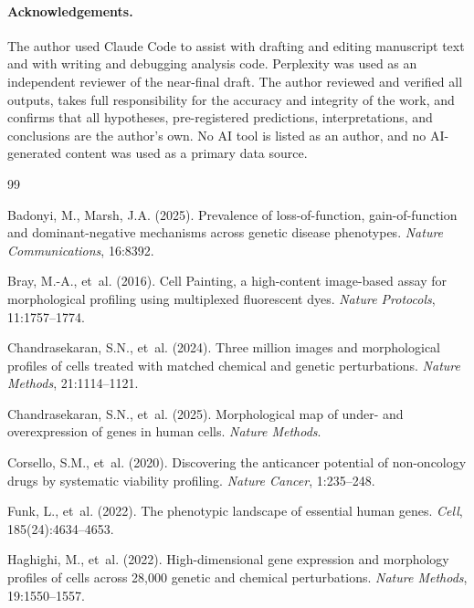 \documentclass[11pt]{article}
\begin{document}
\paragraph{Acknowledgements.}
The author used Claude Code \cite{claudecode} to assist with drafting and editing manuscript text and with writing and debugging analysis code. Perplexity \cite{perplexityai} was used as an independent reviewer of the near-final draft. The author reviewed and verified all outputs, takes full responsibility for the accuracy and integrity of the work, and confirms that all hypotheses, pre-registered predictions, interpretations, and conclusions are the author's own. No AI tool is listed as an author, and no AI-generated content was used as a primary data source.

\begin{thebibliography}{99}

Badonyi, M., Marsh, J.A. (2025).
Prevalence of loss-of-function, gain-of-function and dominant-negative mechanisms across genetic disease phenotypes.
\textit{Nature Communications}, 16:8392.

Bray, M.-A., et~al. (2016).
Cell Painting, a high-content image-based assay for morphological profiling using multiplexed fluorescent dyes.
\textit{Nature Protocols}, 11:1757--1774.

Chandrasekaran, S.N., et~al. (2024).
Three million images and morphological profiles of cells treated with matched chemical and genetic perturbations.
\textit{Nature Methods}, 21:1114--1121.

Chandrasekaran, S.N., et~al. (2025).
Morphological map of under- and overexpression of genes in human cells.
\textit{Nature Methods}.

Corsello, S.M., et~al. (2020).
Discovering the anticancer potential of non-oncology drugs by systematic viability profiling.
\textit{Nature Cancer}, 1:235--248.

Funk, L., et~al. (2022).
The phenotypic landscape of essential human genes.
\textit{Cell}, 185(24):4634--4653.

Haghighi, M., et~al. (2022).
High-dimensional gene expression and morphology profiles of cells across 28,000 genetic and chemical perturbations.
\textit{Nature Methods}, 19:1550--1557.


\end{thebibliography}
\end{document}
